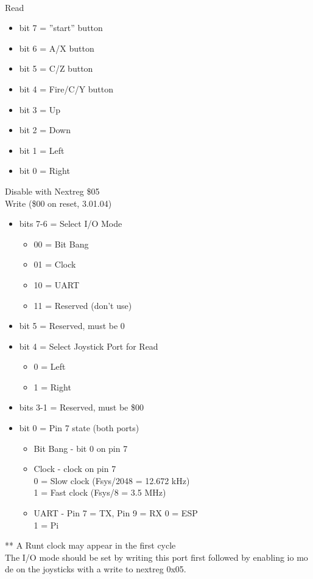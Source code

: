 \\
Read
\begin{itemize}
\item[] bit 7 = ''start'' button
\item[] bit 6 = A/X button
\item[] bit 5 = C/Z button
\item[] bit 4 = Fire/C/Y button
\item[] bit 3 = Up
\item[] bit 2 = Down
\item[] bit 1 = Left
\item[] bit 0 = Right
\end{itemize}
Disable with Nextreg \$05\\
Write (\$00 on reset, 3.01.04)
\begin{itemize}
\item[] bits 7-6 = Select I/O Mode
  \begin{itemize}
  \item[] 00 = Bit Bang
  \item[] 01 = Clock
  \item[] 10 = UART
  \item[] 11 = Reserved (don't use)
  \end{itemize}
\item[] bit 5 = Reserved, must be 0
\item[] bit 4 = Select Joystick Port for Read
  \begin{itemize}
  \item[] 0 = Left
  \item[] 1 = Right
  \end{itemize}
\item[] bits 3-1 = Reserved, must be \$00
\item[] bit 0 = Pin 7 state (both ports)
  \begin{itemize}
  \item Bit Bang - bit 0 on pin 7
  \item Clock - clock on pin 7\\
    0 = Slow clock (Fsys/2048 = 12.672 kHz)\\
    1 = Fast clock (Fsys/8 = 3.5 MHz)
  \item UART - Pin 7 = TX, Pin 9 = RX
    0 = ESP\\
    1 = Pi
  \end{itemize}
\end{itemize}
** A Runt clock may appear in the first cycle\\
The I/O mode should be set by writing this port first followed by
enabling io mo de on the joysticks with a write to nextreg 0x05.


